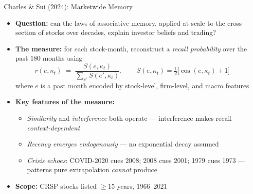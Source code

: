 \documentclass[aspectratio=169, 11pt]{beamer}
\begin{document}
\begin{frame}{Charles \& Sui (2024): Marketwide Memory}
\begin{itemize}
\item \textbf{Question:} can the laws of associative memory, applied at scale to the cross-section of stocks over decades, explain investor beliefs and trading?
\item \textbf{The measure:} for each stock-month, reconstruct a \emph{recall probability} over the past 180 months using
\[
r(e,\kappa_t) \;=\; \frac{S(e,\kappa_t)}{\sum_{e'} S(e',\kappa_t)}, \qquad S(e,\kappa_t) = \tfrac{1}{2}\bigl[\cos(e,\kappa_t) + 1\bigr]
\]
where $e$ is a past month encoded by stock-level, firm-level, and macro features
\item \textbf{Key features of the measure:}
  \begin{itemize}
  \item \emph{Similarity} and \emph{interference} both operate --- interference makes recall \emph{context-dependent}
  \item \emph{Recency emerges endogenously} --- no exponential decay assumed
  \item \emph{Crisis echoes}: COVID-2020 cues 2008; 2008 cues 2001; 1979 cues 1973 --- patterns pure extrapolation \emph{cannot} produce
  \end{itemize}
\item \textbf{Scope:} CRSP stocks listed $\geq$15 years, 1966--2021
\end{itemize}
\end{frame}
\end{document}
